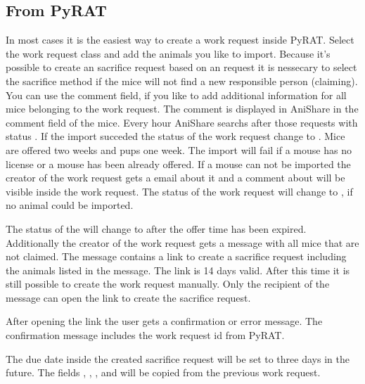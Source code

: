 \documentclass[letterpaper,10pt,openany,oneside,english]{sphinxmanual}
\begin{document}
\subsection{From PyRAT}
\label{\detokenize{index:from-pyrat}}
In most cases it is the easiest way to create a work request inside PyRAT. Select the work request class  and add the animals you like
to import. Because it’s possible to create an sacrifice request based on an  request it is nessecary to select the sacrifice method if the mice will not find a new responsible person (claiming).
You can use the comment field, if you like to add additional information for all mice belonging to the work request. The comment is displayed in AniShare in the comment field of the mice.
Every hour AniShare searchs after those requests with status . If the import succeded the status of the work request
change to . Mice are offered two weeks and pups one week. The import will fail if a mouse has no license or a mouse has been already offered. If a mouse can not be imported the
creator of the work request gets a email about it and a comment about will be visible inside the work request. The status of the work request will change to
, if no animal could be imported.

\noindent{}

The status of the  will change to  after the offer time has been expired. Additionally the creator of the  work request
gets a message with all mice that are not claimed. The message contains a link to create a sacrifice request including the animals listed in the message.
The link is 14 days valid. After this time it is still possible to create the work request manually. Only the recipient of the message can open the link to create the sacrifice request.

\noindent{}

After opening the link the user gets a confirmation or error message. The confirmation message includes the work request id from PyRAT.

\noindent{}

The due date inside the created sacrifice request will be set to three days in the future. The fields , , ,
 and  will be copied from the previous  work request.
\end{document}
